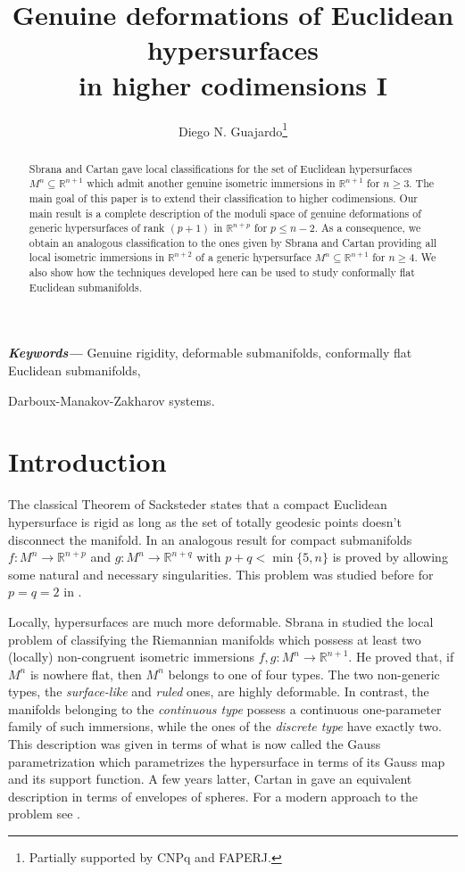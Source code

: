 \documentclass{article}
\title{Genuine deformations of Euclidean hypersurfaces\\ in higher codimensions I}
\author{Diego N. Guajardo\footnote{Partially supported by CNPq and FAPERJ.}}
\date{}
\theoremstyle{remark}
\providecommand{\keywords}[1]
{
  \small	
  \textbf{\textit{Keywords---}} #1
}
\begin{document}
\maketitle
\begin{abstract}
    Sbrana and Cartan gave local classifications for the set of Euclidean hypersurfaces $M^n\subseteq\mathbb{R}^{n+1}$ which admit another genuine isometric immersions in $\mathbb{R}^{n+1}$ for $n\geq 3$. The main goal of this paper is to extend their classification to higher codimensions. Our main result is a complete description of the moduli space of genuine deformations of generic hypersurfaces of rank $(p+1)$ in $\mathbb{R}^{n+p}$ for $p\leq n-2$. As a consequence, we obtain an analogous classification to the ones given by Sbrana and Cartan providing all local isometric immersions in $\mathbb{R}^{n+2}$ of a generic hypersurface $M^n\subseteq\mathbb{R}^{n+1}$ for $n\geq 4$. We also show how the techniques developed here can be used to study conformally flat Euclidean submanifolds. 
\end{abstract}
\hspace{30pt}
\keywords{Genuine rigidity, deformable submanifolds, conformally flat Euclidean submanifolds,

Darboux-Manakov-Zakharov systems.}
\section{Introduction}

The classical Theorem of Sacksteder \cite{Sack} states that a compact Euclidean hypersurface is rigid as long as the set of totally geodesic points doesn't disconnect the manifold. 
In \cite{FG} an analogous result for compact submanifolds $f:M^n\rightarrow\mathbb{R}^{n+p}$ and $g:M^n\rightarrow\mathbb{R}^{n+q}$ with $p+q<\min\{5,n\}$ is proved by allowing some natural and necessary singularities. This problem was studied before for $p=q=2$ in \cite{DG2}.

Locally, hypersurfaces are much more deformable. Sbrana in \cite{Sb} studied the local problem of classifying the Riemannian manifolds which possess at least two (locally) non-congruent isometric immersions $f,g:M^n\rightarrow\mathbb{R}^{n+1}$. 
He proved that, if $M^n$ is nowhere flat, then $M^n$ belongs to one of four types. The two non-generic types, the {\it surface-like} and {\it ruled} ones, are highly deformable. 
In contrast, the manifolds belonging to the {\it continuous type} possess a continuous one-parameter family of such immersions, while the ones of the {\it discrete type} have exactly two. This description was given in terms of what is now called the Gauss parametrization which parametrizes the hypersurface in terms of its Gauss map and its support function. A few years latter, Cartan in \cite{Ca} gave an equivalent description in terms of envelopes of spheres. For a modern approach to the problem see \cite{DFT2}.
\end{document}
